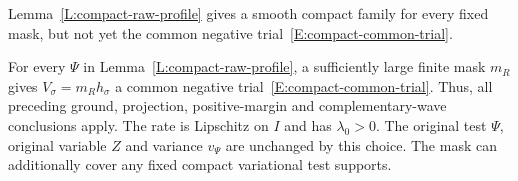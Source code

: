 Lemma~\ref{L:compact-raw-profile} gives a smooth compact family for every
fixed mask, but not yet the common negative
trial~\eqref{E:compact-common-trial}.

\begin{proposition}
  \label{P:compact-original-common-trial}
  For every $\Psi$ in Lemma~\ref{L:compact-raw-profile}, a sufficiently large
  finite mask $m_R$ gives $V_\sigma = m_Rh_\sigma$ a common negative
  trial~\eqref{E:compact-common-trial}. Thus, all preceding ground, projection,
  positive-margin and complementary-wave conclusions apply. The rate is
  Lipschitz on $I$ and has $\lambda_0 > 0$. The original test $\Psi$, original
  variable $Z$ and variance $v_\Psi$ are unchanged by this choice. The mask can
  additionally cover any fixed compact variational test supports.
\end{proposition}


